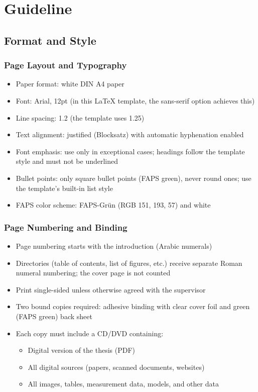 \setcounter{chapter}{-1}
\chapter{Guideline}\label{ch:guideline}

\section{Format and Style}

\subsection{Page Layout and Typography}
\begin{itemize}
    \item Paper format: white DIN A4 paper
    \item Font: Arial, 12pt (in this LaTeX template, the sans-serif option achieves this)
    \item Line spacing: 1.2 (the template uses 1.25)
    \item Text alignment: justified (Blocksatz) with automatic hyphenation enabled
    \item Font emphasis: use only in exceptional cases; headings follow the template style and must not be underlined
    \item Bullet points: only square bullet points (FAPS green), never round ones; use the template's built-in list style
    \item FAPS color scheme: FAPS-Grün (RGB 151, 193, 57) and white
\end{itemize}

\subsection{Page Numbering and Binding}
\begin{itemize}
    \item Page numbering starts with the introduction (Arabic numerals)
    \item Directories (table of contents, list of figures, etc.) receive separate Roman numeral numbering; the cover page is not counted
    \item Print single-sided unless otherwise agreed with the supervisor
    \item Two bound copies required: adhesive binding with clear cover foil and green (FAPS green) back sheet
    \item Each copy must include a CD/DVD containing:
    \begin{itemize}
        \item Digital version of the thesis (PDF)
        \item All digital sources (papers, scanned documents, websites)
        \item All images, tables, measurement data, models, and other data
    \end{itemize}
\end{itemize}

